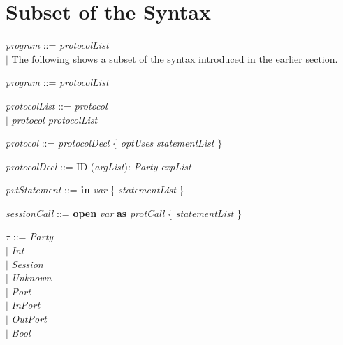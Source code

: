 
\section{Subset of the Syntax}
\textit{program} ::= \textit{protocolList}\\
\hspace*{5.3em} $ | $ \hspace{0.4em}
The following shows a subset of the syntax introduced in the earlier section.

\textit{program} ::= \textit{protocolList}\smallskip

\textit{protocolList} ::= \textit{protocol}\\
						\hspace*{5.3em} $ | $ \hspace{0.4em} \textit{protocol protocolList}\smallskip

\textit{protocol} ::= \textit{protocolDecl} $ \{ $ \textit{optUses} \textit{statementList} $\}$\smallskip

\textit{protocolDecl} ::= ID (\textit{argList}): \textit{Party} \textit{expList}\smallskip

\textit{pvtStatement} ::= \textbf{in} \textit{var} \{ \textit{statementList} \}\smallskip

\textit{sessionCall} ::= \textbf{open} \textit{var} \textbf{as} \textit{protCall} \{ \textit{statementList} \}\smallskip

$\tau$ ::= \hspace{3.8em} \textit{Party} \\
\hspace*{5.3em} $ | $ \hspace{0.4em} \textit{Int} \\
\hspace*{5.3em} $ | $ \hspace{0.4em} \textit{Session} \\
\hspace*{5.3em} $ | $ \hspace{0.4em} \textit{Unknown} \\
\hspace*{5.3em} $ | $ \hspace{0.4em} \textit{Port}\\
\hspace*{5.3em} $ | $ \hspace{0.4em} \textit{InPort}\\
\hspace*{5.3em} $ | $ \hspace{0.4em} \textit{OutPort}\\
\hspace*{5.3em} $ | $ \hspace{0.4em} \textit{Bool}\smallskip
